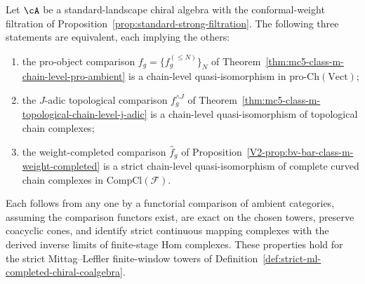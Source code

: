 \begin{proposition}
\label{prop:ambient-equivalence}
\ClaimStatusProvedHere
{}%
Let $\cA$ be a standard-landscape chiral algebra with the conformal-weight
filtration of
Proposition~\textup{\ref{prop:standard-strong-filtration}}. The following
three statements are equivalent, each implying the others:
\begin{enumerate}[label=\textup{(\roman*)}]
\item the pro-object comparison
$f_g = \{f_g^{(\leq N)}\}_N$ of
Theorem~\textup{\ref{thm:mc5-class-m-chain-level-pro-ambient}}
is a chain-level quasi-isomorphism in
$\mathrm{pro}\text{-}\mathrm{Ch}(\mathrm{Vect})$;
\item the $J$-adic topological comparison $f_g^{\wedge J}$ of
Theorem~\textup{\ref{thm:mc5-class-m-topological-chain-level-j-adic}}
is a chain-level quasi-isomorphism of topological chain complexes;
\item the weight-completed comparison $\widehat{f}_g$ of
Proposition~\textup{\ref{V2-prop:bv-bar-class-m-weight-completed}} is a
strict chain-level quasi-isomorphism of complete curved chain complexes
in $\mathrm{CompCl}(\mathcal{F})$.
\end{enumerate}
Each follows from any one by a functorial comparison of ambient
categories, assuming the comparison functors exist, are exact on the
chosen towers, preserve coacyclic cones, and identify strict continuous
mapping complexes with the derived inverse limits of finite-stage Hom
complexes. These properties hold for the strict Mittag--Leffler
finite-window towers of Definition~\ref{def:strict-ml-completed-chiral-coalgebra}.
\end{proposition}

